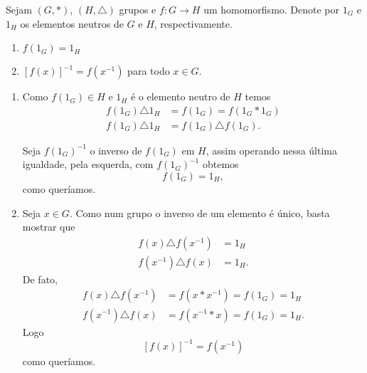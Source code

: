 \begin{proposicao}
    Sejam $(G, *)$, $(H, \triangle)$ grupos e $f : G \to H$ um homomorfismo. Denote por $1_G$ e $1_H$ os elementos neutros de $G$ e $H$, respectivamente.
    \begin{enumerate}[label={\roman*})]
        \item $f(1_G) = 1_H$
        \item $[f(x)]^{-1} = f(x^{-1})$ para todo $x \in G$.
    \end{enumerate}
\end{proposicao}
\begin{prova}
    \begin{enumerate}[label={\roman*})]
        \item Como $f(1_G) \in H$ e $1_H$ é o elemento neutro de $H$ temos
        \begin{align*}
            f(1_G) \triangle 1_H &= f(1_G) = f(1_G * 1_G)\\
            f(1_G) \triangle 1_H &= f(1_G) \triangle f(1_G).
        \end{align*}

        Seja $f(1_G)^{-1}$ o inverso de $f(1_G)$ em $H$, assim operando nessa \'ultima igualdade, pela esquerda, com $f(1_G)^{-1}$ obtemos
        \[
            f(1_G) = 1_H,
        \]
        como queríamos.

        \item Seja $x \in G$. Como num grupo o inverso de um elemento é \'unico, basta mostrar que
        \begin{align*}
            f(x) \triangle f(x^{-1}) &= 1_H\\
            f(x^{-1}) \triangle f(x) &= 1_H.
        \end{align*}
        De fato,
        \begin{align*}
            f(x) \triangle f(x^{-1}) &= f(x * x^{-1}) = f(1_G) = 1_H\\
            f(x^{-1}) \triangle f(x) &= f(x^{-1} * x) = f(1_G) = 1_H.
        \end{align*}
        Logo
        \[
            [f(x)]^{-1} = f(x^{-1})
        \]
        como queríamos.
    \end{enumerate}
\end{prova}

